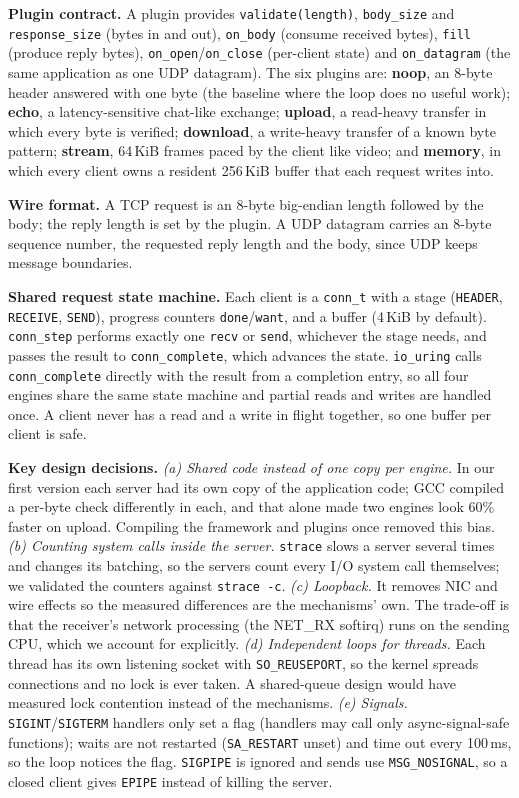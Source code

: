 \documentclass[conference,10pt]{IEEEtran}
\newcommand{\code}[1]{\texttt{#1}}
\begin{document}
\textbf{Plugin contract.} A plugin provides \code{validate(length)}, \code{body\_size} and \code{response\_size} (bytes in and out), \code{on\_body} (consume received bytes), \code{fill} (produce reply bytes), \code{on\_open}/\code{on\_close} (per-client state) and \code{on\_datagram} (the same application as one UDP datagram). The six plugins are: \textbf{noop}, an 8-byte header answered with one byte (the baseline where the loop does no useful work); \textbf{echo}, a latency-sensitive chat-like exchange; \textbf{upload}, a read-heavy transfer in which every byte is verified; \textbf{download}, a write-heavy transfer of a known byte pattern; \textbf{stream}, 64\,KiB frames paced by the client like video; and \textbf{memory}, in which every client owns a resident 256\,KiB buffer that each request writes into.

\textbf{Wire format.} A TCP request is an 8-byte big-endian length followed by the body; the reply length is set by the plugin. A UDP datagram carries an 8-byte sequence number, the requested reply length and the body, since UDP keeps message boundaries.

\textbf{Shared request state machine.} Each client is a \code{conn\_t} with a stage (\code{HEADER}, \code{RECEIVE}, \code{SEND}), progress counters \code{done}/\code{want}, and a buffer (4\,KiB by default). \code{conn\_step} performs exactly one \code{recv} or \code{send}, whichever the stage needs, and passes the result to \code{conn\_complete}, which advances the state. \code{io\_uring} calls \code{conn\_complete} directly with the result from a completion entry, so all four engines share the same state machine and partial reads and writes are handled once. A client never has a read and a write in flight together, so one buffer per client is safe.

\textbf{Key design decisions.}
\emph{(a) Shared code instead of one copy per engine.} In our first version each server had its own copy of the application code; GCC compiled a per-byte check differently in each, and that alone made two engines look 60\% faster on upload. Compiling the framework and plugins once removed this bias.
\emph{(b) Counting system calls inside the server.} \code{strace} slows a server several times and changes its batching, so the servers count every I/O system call themselves; we validated the counters against \code{strace -c}.
\emph{(c) Loopback.} It removes NIC and wire effects so the measured differences are the mechanisms' own. The trade-off is that the receiver's network processing (the NET\_RX softirq) runs on the sending CPU, which we account for explicitly.
\emph{(d) Independent loops for threads.} Each thread has its own listening socket with \code{SO\_REUSEPORT}, so the kernel spreads connections and no lock is ever taken. A shared-queue design would have measured lock contention instead of the mechanisms.
\emph{(e) Signals.} \code{SIGINT}/\code{SIGTERM} handlers only set a flag (handlers may call only async-signal-safe functions); waits are not restarted (\code{SA\_RESTART} unset) and time out every 100\,ms, so the loop notices the flag. \code{SIGPIPE} is ignored and sends use \code{MSG\_NOSIGNAL}, so a closed client gives \code{EPIPE} instead of killing the server.
\end{document}
